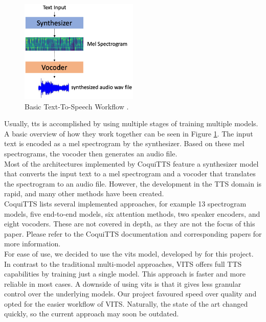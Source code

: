 \documentclass[
  a4paper,  %
  twoside,  %
  bibliography=totoc,
  headsepline,
  cleardoublepage=empty,
  parskip=half,
  draft=false
]{scrbook}
\begin{document}
\begin{figure}[h]
  \centering
  \includegraphics[width=0.5\textwidth]{./graphics/tts/tts-workflow.png}
  \caption{Basic Text-To-Speech Workflow \cite{jemineRealTimeVoiceCloning2019}.}
  \label{fig:tts-explainer}
\end{figure}

Usually, \gls{tts} is accomplished by using multiple stages of training multiple models. A basic overview of how they work together can be seen in Figure \ref{fig:tts-explainer}. The input text is encoded as a mel spectrogram by the synthesizer. Based on these mel spectrograms, the vocoder then generates an audio file. \\
Most of the architectures implemented by CoquiTTS feature a synthesizer model that converts the input text to a mel spectrogram and a vocoder that translates the spectrogram to an audio file. However, the development in the TTS domain is rapid, and many other methods have been created. \\
CoquiTTS lists several implemented approaches, for example 13 spectrogram models, five end-to-end models, six attention methods, two speaker encoders, and eight vocoders. These are not covered in depth, as they are not the focus of this paper. Please refer to the CoquiTTS documentation and corresponding papers for more information.\\
For ease of use, we decided to use the \gls{vits} model, developed by \citet{kimConditionalVariationalAutoencoder2021} for this project. In contrast to the traditional multi-model approaches, VITS offers full TTS capabilities by training just a single model. This approach is faster and more reliable in most cases. A downside of using \gls{vits} is that it gives less granular control over the underlying models. Our project favoured speed over quality and opted for the easier workflow of VITS. Naturally, the state of the art changed quickly, so the current approach may soon be outdated.
\end{document}
